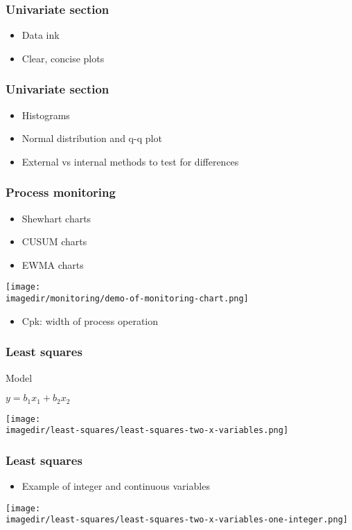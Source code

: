 \begin{frame}\frametitle{Univariate section}
	\begin{itemize}
		\item	Data ink
		\item	Clear, concise plots
	\end{itemize}
\end{frame}

\begin{frame}\frametitle{Univariate section}

	\begin{itemize}
		\item	Histograms
		\item	Normal distribution and q-q plot
		\item	External vs internal methods to test for differences
	\end{itemize}
\end{frame}

\begin{frame}\frametitle{Process monitoring}
	\begin{itemize}
		\item	Shewhart charts
		\item	CUSUM charts
		\item	EWMA charts
	\end{itemize}

	\texttt{[image: \\imagedir/monitoring/demo-of-monitoring-chart.png]}
	\begin{itemize}
		\item	Cpk: width of process operation
	\end{itemize}
\end{frame}

\begin{frame}\frametitle{Least squares}
	\begin{block}
		{Model}
		\begin{center}
			$y = b_1x_1 + b_2x_2$
		\end{center}
	\end{block}

	\texttt{[image: \\imagedir/least-squares/least-squares-two-x-variables.png]}
\end{frame}

\begin{frame}\frametitle{Least squares}
	\begin{itemize}
		\item	Example of integer and continuous variables
	\end{itemize}

	\texttt{[image: \\imagedir/least-squares/least-squares-two-x-variables-one-integer.png]}
\end{frame}

